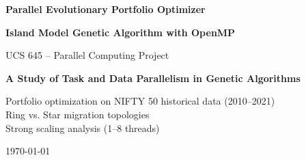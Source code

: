 \begin{titlepage}
    \centering
    \vspace*{\fill}
    
    \textbf{\LARGE Parallel Evolutionary Portfolio Optimizer}
    
    \vspace{0.5cm}
    
    \textbf{\large Island Model Genetic Algorithm with OpenMP}
    
    \vspace{1cm}
    
    \Large UCS 645 -- Parallel Computing Project
    
    \vspace{2cm}
    
    \Large \textbf{A Study of Task and Data Parallelism in Genetic Algorithms}
    
    \vspace{3cm}
    
    \normalsize
    Portfolio optimization on NIFTY 50 historical data (2010--2021) \\
    Ring vs. Star migration topologies \\
    Strong scaling analysis (1--8 threads)
    
    \vspace{4cm}
    
    \today
    
    \vspace*{\fill}
    
\end{titlepage}
